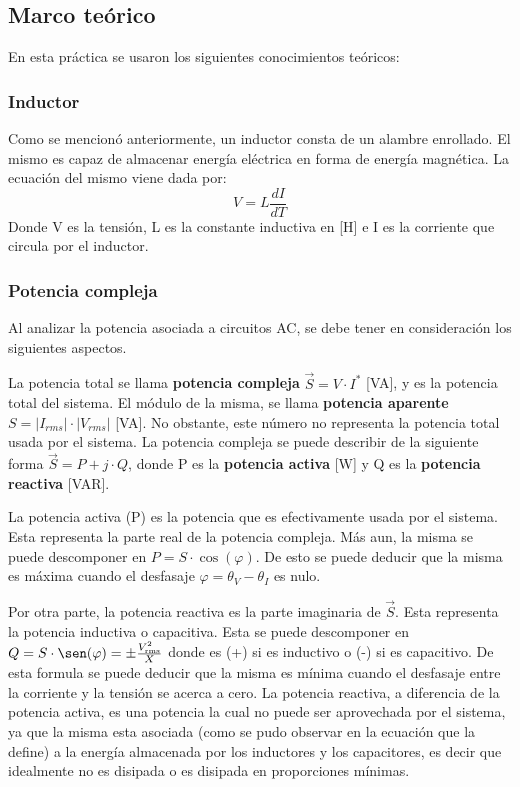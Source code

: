 \documentclass{article}
\begin{document}
        \subsection{Marco teórico}

        En esta práctica se usaron los siguientes conocimientos teóricos:

        \subsubsection{Inductor}

        Como se mencionó anteriormente, un inductor consta de un alambre enrollado. El mismo es capaz de almacenar energía eléctrica en forma de energía magnética.
         La ecuación del mismo viene dada por:
        \begin{equation*}
            V=L \frac{dI}{dT}
        \end{equation*}
        Donde V es la tensión, L es la constante inductiva en [H] e I es la corriente que circula por el inductor.

        \subsubsection{Potencia compleja}

        Al analizar la potencia asociada a circuitos AC, se debe tener en consideración los siguientes aspectos.\par
        La potencia total se llama { \bfseries potencia compleja} $\vec{S}= V \cdot I^{*}$ [VA], y es la potencia total del sistema. El módulo de la misma, se llama {\bfseries potencia aparente} $S=|I_{rms}| \cdot |V_{rms}|$ [VA]. No obstante, este número no representa la potencia total usada por el sistema.
        La potencia compleja se puede describir de la siguiente forma $\vec{S}=P + j \cdot Q$, donde P es la { \bfseries potencia activa}  [W] y Q es la {\bfseries potencia reactiva} [VAR]. \par

        La potencia activa (P) es la potencia que es efectivamente usada por el sistema. Esta representa la parte real de la potencia compleja.
        Más aun, la misma se puede descomponer en $P= S \cdot \cos (\varphi)$. De esto se puede deducir que la misma es máxima cuando el desfasaje $\varphi = \theta_{V} - \theta_I $ es nulo. \par

        Por otra parte, la potencia reactiva es la parte imaginaria de $\vec{S}$. Esta representa la potencia inductiva o capacitiva. Esta se puede descomponer en $ Q = S \cdot \sen (\varphi)= \pm \frac{V_\text{rms}^2}{X}$ donde es (+) si es inductivo o (-) si es capacitivo.
        De esta formula se puede deducir que la misma es mínima cuando el desfasaje entre la corriente y la tensión se acerca a cero. La potencia reactiva, a diferencia de la potencia activa, es una potencia la cual no puede ser aprovechada por el sistema, 
        ya que la misma esta asociada (como se pudo observar en la ecuación que la define) a la energía almacenada por los inductores y los capacitores, es decir que idealmente no es disipada o es disipada en proporciones mínimas. \par
\end{document}

